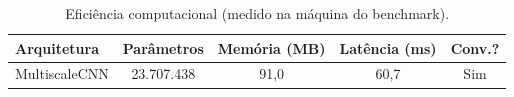 \begin{table}[H]
\centering
\caption{Eficiência computacional (medido na máquina do benchmark).}
\label{tab:bench_eficiencia}
\small\singlespacing
\begin{tabular}{lcccc}
\toprule
\textbf{Arquitetura} & \textbf{Parâmetros} & \textbf{Memória (MB)} & \textbf{Latência (ms)} & \textbf{Conv.?} \\
\midrule
MultiscaleCNN & 23.707.438 & 91,0 & 60,7 & \textcolor{successgreen}{Sim} \\
\bottomrule
\end{tabular}
\end{table}
